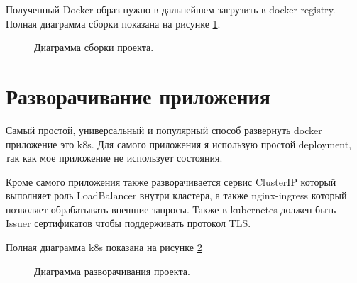 \documentclass[a4paper,article,14pt]{extarticle}
\begin{document}
Полученный Docker образ нужно в дальнейшем загрузить в docker registry.
Полная диаграмма сборки показана на рисунке \ref{build}.

\begin{figure}[ht]
\begin{center}
\caption{\label{build} Диаграмма сборки проекта.}
\end {center}
\end {figure}

\section{Разворачивание приложения}

Самый простой, универсальный и популярный способ развернуть docker приложение это k8s.
Для самого приложения я использую простой deployment, так как мое приложение не использует состояния.

Кроме самого приложения также разворачивается сервис ClusterIP который выполняет роль LoadBalancer внутри кластера,
а также nginx-ingress который позволяет обрабатывать внешние запросы. 
Также в kubernetes должен быть Issuer сертификатов чтобы поддерживать протокол TLS.

Полная диаграмма k8s показана на рисунке \ref{k8s}

\begin{figure}[ht]
\begin{center}
\caption{\label{k8s} Диаграмма разворачивания проекта.}
\end {center}
\end {figure}
\end{document}
